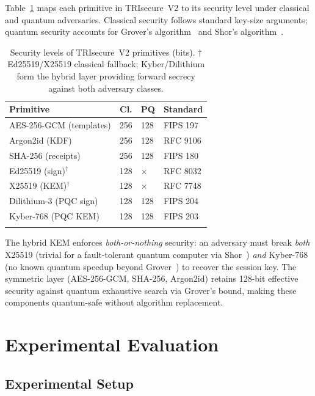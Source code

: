 \documentclass[pdflatex,sn-mathphys-num]{sn-jnl}%
\theoremstyle{thmstyleone}%
\theoremstyle{thmstyletwo}%
\theoremstyle{thmstylethree}%
\begin{document}
Table~\ref{tab:security_levels} maps each primitive in TRIsecure~V2 to its
security level under classical and quantum adversaries. Classical security
follows standard key-size arguments; quantum security accounts for Grover's
algorithm~\cite{grover1996fast} and Shor's algorithm~\cite{shor1994algorithms}.

\begin{table}[t]
\caption{Security levels of TRIsecure~V2 primitives (bits).
  $\dagger$ Ed25519/X25519 classical fallback; Kyber/Dilithium form the
  hybrid layer providing forward secrecy against both adversary classes.}
\label{tab:security_levels}%
\begin{tabular}{@{}lcll@{}}
  \toprule
  Primitive & Cl. & PQ & Standard \\
  \midrule
  AES-256-GCM (templates) & 256 & 128 & FIPS 197 \\
  Argon2id (KDF)          & 256 & 128 & RFC 9106 \\
  SHA-256 (receipts)      & 256 & 128 & FIPS 180 \\
  Ed25519 (sign)$^\dagger$& 128 & $\times$ & RFC 8032 \\
  X25519 (KEM)$^\dagger$  & 128 & $\times$ & RFC 7748 \\
  Dilithium-3 (PQC sign)  & 128 & 128 & FIPS 204 \\
  Kyber-768 (PQC KEM)     & 128 & 128 & FIPS 203 \\
  \botrule
\end{tabular}
\end{table}

The hybrid KEM enforces \emph{both-or-nothing} security: an adversary must
break \emph{both} X25519 (trivial for a fault-tolerant quantum computer via
Shor~\cite{shor1994algorithms}) \emph{and} Kyber-768 (no known quantum
speedup beyond Grover~\cite{grover1996fast}) to recover the session key. The
symmetric layer (AES-256-GCM, SHA-256, Argon2id) retains 128-bit effective
security against quantum exhaustive search via Grover's bound, making these
components quantum-safe without algorithm replacement.

\section{Experimental Evaluation}\label{sec:evaluation}

\subsection{Experimental Setup}
\end{document}
